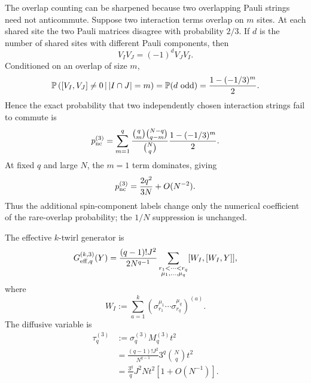 \documentclass{article}
\theoremstyle{definition}
\begin{document}
The overlap counting can be sharpened because two overlapping Pauli
strings need not anticommute.  Suppose two interaction terms overlap on
$m$ sites.  At each shared site the two Pauli matrices disagree with
probability $2/3$.  If $d$ is the number of shared sites with different
Pauli components, then
\begin{equation}
    V_IV_J=(-1)^dV_JV_I.
    \label{eq:SW_commutation_sign}
\end{equation}
Conditioned on an overlap of size $m$,
\begin{equation}
    {\mathbb P}
    \left(
       [V_I,V_J]\neq0
       \,\middle|\,
       |I\cap J|=m
    \right)
    =
    {\mathbb P}(d\ {\rm odd})
    =
    \frac{1-(-1/3)^m}{2}.
    \label{eq:SW_noncommuting_given_m}
\end{equation}
Hence the exact probability that two independently chosen interaction
strings fail to commute is
\begin{equation}
    p_{\rm nc}^{(3)}
    =
    \sum_{m=1}^q
    \frac{
       \binom qm\binom{N-q}{q-m}
    }{
       \binom Nq
    }
    \frac{1-(-1/3)^m}{2}.
    \label{eq:SW_pnc_exact}
\end{equation}
At fixed $q$ and large $N$, the $m=1$ term dominates, giving
\begin{equation}
    p_{\rm nc}^{(3)}
    =
    \frac{2q^2}{3N}
    +
    O(N^{-2}).
    \label{eq:SW_pnc_largeN}
\end{equation}
Thus the additional spin-component labels change only the numerical
coefficient of the rare-overlap probability; the $1/N$ suppression is
unchanged.

The effective $k$-twirl generator is
\begin{equation}
    G_{{\rm eff},q}^{(k,3)}(Y)
    =
    \frac{(q-1)!J^2}{2N^{q-1}}
    \sum_{\substack{r_1<\cdots<r_q\\
                    \mu_1,\ldots,\mu_q}}
    [W_I,[W_I,Y]],
    \label{eq:SW_Geff_q}
\end{equation}
where
\begin{equation}
    W_I
    :=
    \sum_{a=1}^k
    \left(
       \sigma_{r_1}^{\mu_1}
       \cdots
       \sigma_{r_q}^{\mu_q}
    \right)^{(a)}.
    \label{eq:SW_WI}
\end{equation}
The diffusive variable is
\begin{align}
    \tau_q^{(3)}
    &:=
    \sigma_q^{(3)}M_q^{(3)}t^2
    \nonumber\\
    &=
    \frac{(q-1)!J^2}{N^{q-1}}
    3^q\binom Nq t^2
    \nonumber\\
    &=
    \frac{3^q}{q}J^2Nt^2
    \left[
       1+O(N^{-1})
    \right].
    \label{eq:SW_tau_general}
\end{align}
\end{document}
